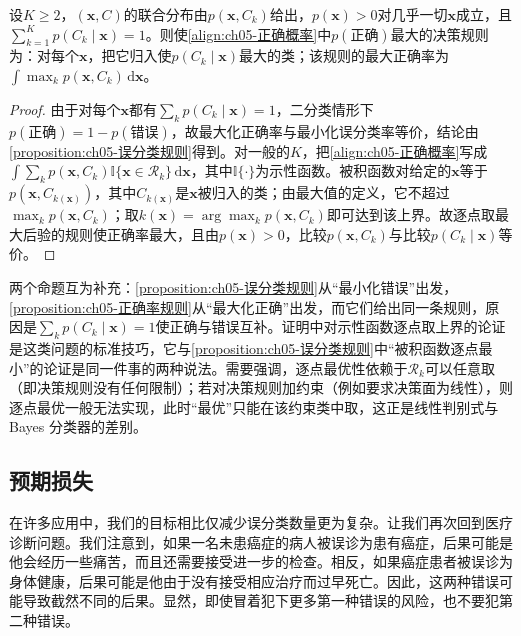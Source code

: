 \documentclass[../../main.tex]{subfiles}
\begin{document}
\begin{proposition}[最大正确率规则]\label{proposition:ch05-正确率规则}
设$K\geqslant2$，$(\boldsymbol{x},C)$的联合分布由$p(\boldsymbol{x},C_k)$给出，$p(\boldsymbol{x})>0$对几乎一切$\boldsymbol{x}$成立，且$\sum_{k=1}^{K}p(C_k\mid\boldsymbol{x})=1$。则使\eqref{align:ch05-正确概率}中$p(\text{正确})$最大的决策规则为：对每个$\boldsymbol{x}$，把它归入使$p(C_k\mid\boldsymbol{x})$最大的类；该规则的最大正确率为$\int\max_k p(\boldsymbol{x},C_k)\,\mathrm{d}\boldsymbol{x}$。
\end{proposition}

\begin{proof}
由于对每个$\boldsymbol{x}$都有$\sum_k p(C_k\mid\boldsymbol{x})=1$，二分类情形下$p(\text{正确})=1-p(\text{错误})$，故最大化正确率与最小化误分类率等价，结论由\cref{proposition:ch05-误分类规则}得到。对一般的$K$，把\eqref{align:ch05-正确概率}写成$\int\sum_k p(\boldsymbol{x},C_k)\mathbb{I}\{\boldsymbol{x}\in\mathcal{R}_k\}\,\mathrm{d}\boldsymbol{x}$，其中$\mathbb{I}\{\cdot\}$为示性函数。被积函数对给定的$\boldsymbol{x}$等于$p(\boldsymbol{x},C_{k(\boldsymbol{x})})$，其中$C_{k(\boldsymbol{x})}$是$\boldsymbol{x}$被归入的类；由最大值的定义，它不超过$\max_k p(\boldsymbol{x},C_k)$；取$k(\boldsymbol{x})=\arg\max_k p(\boldsymbol{x},C_k)$即可达到该上界。故逐点取最大后验的规则使正确率最大，且由$p(\boldsymbol{x})>0$，比较$p(\boldsymbol{x},C_k)$与比较$p(C_k\mid\boldsymbol{x})$等价。
\end{proof}

\begin{remark}
两个命题互为补充：\cref{proposition:ch05-误分类规则}从“最小化错误”出发，\cref{proposition:ch05-正确率规则}从“最大化正确”出发，而它们给出同一条规则，原因是$\sum_k p(C_k\mid\boldsymbol{x})=1$使正确与错误互补。证明中对示性函数逐点取上界的论证是这类问题的标准技巧，它与\cref{proposition:ch05-误分类规则}中“被积函数逐点最小”的论证是同一件事的两种说法。需要强调，逐点最优性依赖于$\mathcal{R}_k$可以任意取（即决策规则没有任何限制）；若对决策规则加约束（例如要求决策面为线性），则逐点最优一般无法实现，此时“最优”只能在该约束类中取，这正是线性判别式与 Bayes 分类器的差别。
\end{remark}

\subsection{预期损失}\label{subsection:ch05-预期损失}

在许多应用中，我们的目标相比仅减少误分类数量更为复杂。让我们再次回到医疗诊断问题。我们注意到，如果一名未患癌症的病人被误诊为患有癌症，后果可能是他会经历一些痛苦，而且还需要接受进一步的检查。相反，如果癌症患者被误诊为身体健康，后果可能是他由于没有接受相应治疗而过早死亡。因此，这两种错误可能导致截然不同的后果。显然，即使冒着犯下更多第一种错误的风险，也不要犯第二种错误。
\end{document}
